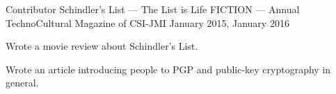 
\begin{cventries}

\cventry%
  {Contributor} %
  {Schindler's List --- The List is Life} %
  {FICTION --- Annual TechnoCultural Magazine of CSI-JMI} %
  {January 2015, January 2016} %
  {%
    \begin{cvitems} %
      \item{Wrote a movie review about Schindler's List.}
      \item{Wrote an article introducing people to PGP and public-key
            cryptography in general.}
    \end{cvitems}
  }

\end{cventries}
